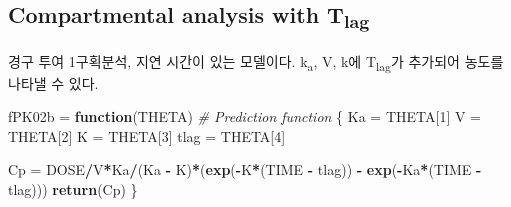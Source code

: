 \documentclass[
  11pt,
  krantz2, a4paper, twoside]{krantz}
\newenvironment{Shaded}{\begin{snugshade}}{\end{snugshade}}
\newcommand{\AttributeTok}[1]{\textcolor[rgb]{0.13,0.29,0.53}{#1}}
\newcommand{\CommentTok}[1]{\textcolor[rgb]{0.56,0.35,0.01}{\textit{#1}}}
\newcommand{\ControlFlowTok}[1]{\textcolor[rgb]{0.13,0.29,0.53}{\textbf{#1}}}
\newcommand{\DecValTok}[1]{\textcolor[rgb]{0.00,0.00,0.81}{#1}}
\newcommand{\FloatTok}[1]{\textcolor[rgb]{0.00,0.00,0.81}{#1}}
\newcommand{\FunctionTok}[1]{\textcolor[rgb]{0.13,0.29,0.53}{\textbf{#1}}}
\newcommand{\NormalTok}[1]{#1}
\newcommand{\OtherTok}[1]{\textcolor[rgb]{0.56,0.35,0.01}{#1}}
\newcommand{\SpecialCharTok}[1]{\textcolor[rgb]{0.81,0.36,0.00}{\textbf{#1}}}
\newcommand{\StringTok}[1]{\textcolor[rgb]{0.31,0.60,0.02}{#1}}
\theoremstyle{definition}
\theoremstyle{definition}
\theoremstyle{definition}
\theoremstyle{definition}
\theoremstyle{remark}
\begin{document}
\subsection{\texorpdfstring{Compartmental analysis with T\textsubscript{lag}}{Compartmental analysis with Tlag}}\label{compartmental-analysis-with-tlag}

경구 투여 1구획분석, 지연 시간이 있는 모델이다. k\textsubscript{a}, V, k에 T\textsubscript{lag}가 추가되어 농도를 나타낼 수 있다.

\small

\begin{Shaded}
\begin{Highlighting}[]
\NormalTok{fPK02b }\OtherTok{=} \ControlFlowTok{function}\NormalTok{(THETA) }\CommentTok{\# Prediction function}
\NormalTok{\{}
\NormalTok{  Ka   }\OtherTok{=}\NormalTok{ THETA[}\DecValTok{1}\NormalTok{]}
\NormalTok{  V    }\OtherTok{=}\NormalTok{ THETA[}\DecValTok{2}\NormalTok{]}
\NormalTok{  K    }\OtherTok{=}\NormalTok{ THETA[}\DecValTok{3}\NormalTok{]}
\NormalTok{  tlag }\OtherTok{=}\NormalTok{ THETA[}\DecValTok{4}\NormalTok{]}

\NormalTok{  Cp  }\OtherTok{=}\NormalTok{ DOSE}\SpecialCharTok{/}\NormalTok{V}\SpecialCharTok{*}\NormalTok{Ka}\SpecialCharTok{/}\NormalTok{(Ka }\SpecialCharTok{{-}}\NormalTok{ K)}\SpecialCharTok{*}\NormalTok{(}\FunctionTok{exp}\NormalTok{(}\SpecialCharTok{{-}}\NormalTok{K}\SpecialCharTok{*}\NormalTok{(TIME }\SpecialCharTok{{-}}\NormalTok{ tlag)) }\SpecialCharTok{{-}} \FunctionTok{exp}\NormalTok{(}\SpecialCharTok{{-}}\NormalTok{Ka}\SpecialCharTok{*}\NormalTok{(TIME }\SpecialCharTok{{-}}\NormalTok{ tlag))) }
  \FunctionTok{return}\NormalTok{(Cp)}
\NormalTok{\}}
\end{Highlighting}
\end{Shaded}

\begin{Shaded}
\end{Shaded}
\end{document}
